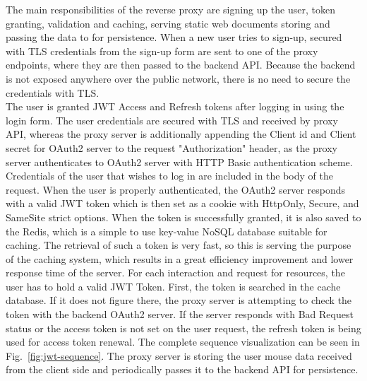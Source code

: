 The main responsibilities of the reverse proxy are signing up the user, token granting, validation and caching, serving static web documents storing and passing the data to for persistence.
When a new user tries to sign-up, secured with TLS credentials from the sign-up form are sent to one of the proxy endpoints, where they are then passed to the backend API.
Because the backend is not exposed anywhere over the public network, there is no need to secure the credentials with TLS.\\
The user is granted JWT Access and Refresh tokens after logging in using the login form.
The user credentials are secured with TLS and received by proxy API, whereas the proxy server is additionally appending the Client id and Client secret for OAuth2 server to the request "Authorization" header, as the proxy server authenticates to OAuth2 server with HTTP Basic authentication scheme.
Credentials of the user that wishes to log in are included in the body of the request.
When the user is properly authenticated, the OAuth2 server responds with a valid JWT token which is then set as a cookie with HttpOnly, Secure, and SameSite strict options.
When the token is successfully granted, it is also saved to the Redis, which is a simple to use key-value NoSQL database suitable for caching.
The retrieval of such a token is very fast, so this is serving the purpose of the caching system, which results in a great efficiency improvement and lower response time of the server.
For each interaction and request for resources, the user has to hold a valid JWT Token.
First, the token is searched in the cache database.
If it does not figure there, the proxy server is attempting to check the token with the backend OAuth2 server.
If the server responds with Bad Request status or the access token is not set on the user request, the refresh token is being used for access token renewal.
The complete sequence visualization can be seen in \mbox{Fig.~\ref{fig:jwt-sequence}}.
The proxy server is storing the user mouse data received from the client side and periodically passes it to the backend API for persistence.




